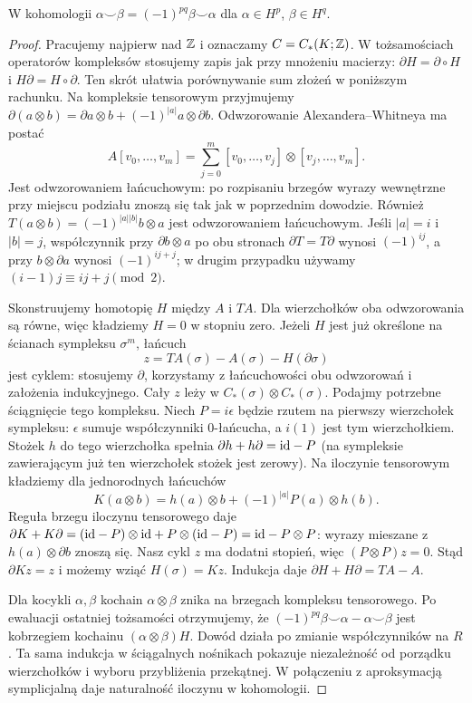\begin{stwierdzenie}
\label{prop:kubek-graded-16}
W kohomologii
$\alpha\smile\beta
=(-1)^{pq}\beta\smile\alpha$
dla $\alpha\in H^p$,
$\beta\in H^q$.
\end{stwierdzenie}
\begin{proof}
Pracujemy najpierw nad $\mathbb{Z}$ i oznaczamy $C=C_*(K;\mathbb{Z})$.
W tożsamościach operatorów kompleksów stosujemy zapis
jak przy mnożeniu macierzy: $\partial H=\partial\circ H$
i $H\partial=H\circ\partial$.
Ten skrót ułatwia porównywanie sum złożeń w poniższym rachunku.
Na kompleksie tensorowym przyjmujemy
$\partial(a\otimes b)=\partial a\otimes b+(-1)^{|a|}a\otimes\partial b$.
Odwzorowanie Alexandera--Whitneya ma postać
\[
 A[v_0,\ldots,v_m]
 =\sum_{j=0}^m[v_0,\ldots,v_j]\otimes[v_j,\ldots,v_m].
\]
Jest odwzorowaniem łańcuchowym: po rozpisaniu brzegów
wyrazy wewnętrzne przy miejscu podziału znoszą się
tak jak w poprzednim dowodzie. Również
$T(a\otimes b)=(-1)^{|a||b|}b\otimes a$
jest odwzorowaniem łańcuchowym.
Jeśli $|a|=i$ i $|b|=j$, współczynnik przy
$\partial b\otimes a$ po obu stronach $\partial T=T\partial$
wynosi $(-1)^{ij}$, a przy $b\otimes\partial a$ wynosi
$(-1)^{ij+j}$; w drugim przypadku używamy
$(i-1)j\equiv ij+j\pmod2$.

Skonstruujemy homotopię $H$ między $A$ i $TA$.
Dla wierzchołków oba odwzorowania są równe, więc
kładziemy $H=0$ w stopniu zero. Jeżeli $H$ jest
już określone na ścianach sympleksu $\sigma^m$,
łańcuch
\[
 z=TA(\sigma)-A(\sigma)-H(\partial\sigma)
\]
jest cyklem: stosujemy $\partial$, korzystamy
z łańcuchowości obu odwzorowań i założenia indukcyjnego.
Cały $z$ leży w $C_*(\sigma)\otimes C_*(\sigma)$.
Podajmy potrzebne ściągnięcie tego kompleksu.
Niech $P=i\epsilon$ będzie rzutem na pierwszy wierzchołek
sympleksu: $\epsilon$ sumuje współczynniki $0$-łańcucha,
a $i(1)$ jest tym wierzchołkiem.
Stożek $h$ do tego wierzchołka spełnia
$\partial h+h\partial=\mathrm{id}-P$
(na sympleksie zawierającym już ten wierzchołek stożek
jest zerowy).
Na iloczynie tensorowym kładziemy dla jednorodnych łańcuchów
\[
 K(a\otimes b)=h(a)\otimes b+(-1)^{|a|}P(a)\otimes h(b).
\]
Reguła brzegu iloczynu tensorowego daje
$\partial K+K\partial
=(\mathrm{id}-P)\otimes\mathrm{id}+P\otimes(\mathrm{id}-P)=\mathrm{id}-P\otimes P$:
wyrazy mieszane z $h(a)\otimes\partial b$ znoszą się.
Nasz cykl $z$ ma dodatni stopień, więc $(P\otimes P)z=0$.
Stąd $\partial Kz=z$ i możemy wziąć $H(\sigma)=Kz$.
Indukcja daje $\partial H+H\partial=TA-A$.

Dla kocykli $\alpha,\beta$ kochain
$\alpha\otimes\beta$ znika na brzegach kompleksu
tensorowego. Po ewaluacji ostatniej tożsamości
otrzymujemy, że
$(-1)^{pq}\beta\smile\alpha-\alpha\smile\beta$
jest kobrzegiem kochainu $(\alpha\otimes\beta)H$.
Dowód działa po zmianie współczynników na $R$.
Ta sama indukcja w ściągalnych nośnikach pokazuje
niezależność od porządku wierzchołków i wyboru
przybliżenia przekątnej. W połączeniu z aproksymacją
symplicjalną daje naturalność iloczynu w kohomologii.
\end{proof}

